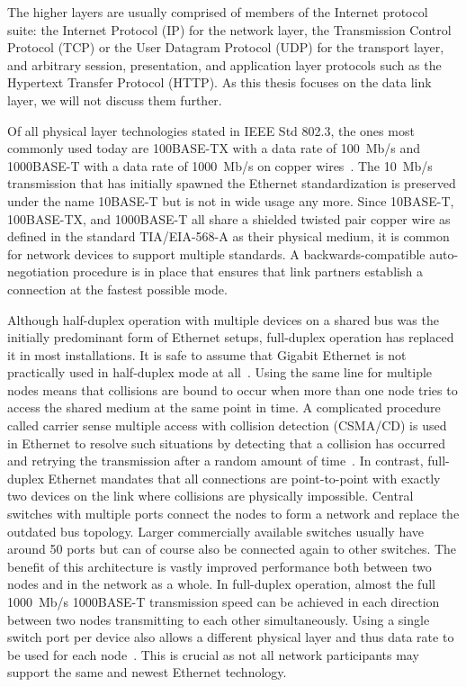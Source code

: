 \documentclass[a4paper, 11pt, oneside]{Thesis}  %
\begin{document}
The higher layers are usually comprised of members of the Internet protocol suite: the Internet Protocol (IP) for the network layer, the Transmission Control Protocol (TCP) or the User Datagram Protocol (UDP) for the transport layer, and arbitrary session, presentation, and application layer protocols such as the Hypertext Transfer Protocol (HTTP). As this thesis focuses on the data link layer, we will not discuss them further. 

Of all physical layer technologies stated in IEEE Std 802.3, the ones most commonly used today are 100BASE-TX with a data rate of 100~Mb/s and 1000BASE-T with a data rate of 1000~Mb/s on copper wires~\cite{heiseEthernet}. The 10~Mb/s transmission that has initially spawned the Ethernet standardization is preserved under the name 10BASE-T but is not in wide usage any more. Since 10BASE-T, 100BASE-TX, and 1000BASE-T all share a shielded twisted pair copper wire as defined in the standard TIA/EIA-568-A as their physical medium, it is common for network devices to support multiple standards. A backwards-compatible auto-negotiation procedure is in place that ensures that link partners establish a connection at the fastest possible mode.

Although half-duplex operation with multiple devices on a shared bus was the initially predominant form of Ethernet setups, full-duplex operation has replaced it in most installations. It is safe to assume that Gigabit Ethernet is not practically used in half-duplex mode at all~\cite{heiseEthernet}. Using the same line for multiple nodes means that collisions are bound to occur when more than one node tries to access the shared medium at the same point in time. A complicated procedure called carrier sense multiple access with collision detection (CSMA/CD) is used in Ethernet to resolve such situations by detecting that a collision has occurred and retrying the transmission after a random amount of time~\cite{heiseEthernet}. In contrast, full-duplex Ethernet mandates that all connections are point-to-point with exactly two devices on the link where collisions are physically impossible. Central switches with multiple ports connect the nodes to form a network and replace the outdated bus topology. Larger commercially available switches usually have around 50 ports but can of course also be connected again to other switches. The benefit of this architecture is vastly improved performance both between two nodes and in the network as a whole. In full-duplex operation, almost the full 1000~Mb/s \mbox{1000BASE-T} transmission speed can be achieved in each direction between two nodes transmitting to each other simultaneously. Using a single switch port per device also allows a different physical layer and thus data rate to be used for each node~\cite{Ethernet}. This is crucial as not all network participants may support the same and newest Ethernet technology.
\end{document}
